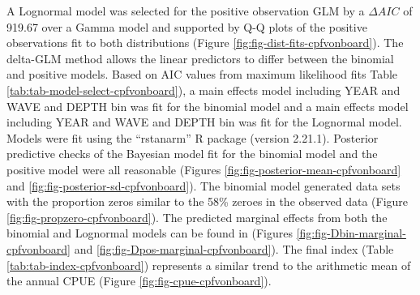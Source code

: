 \documentclass[
]{article}
\begin{document}
A Lognormal model was
selected for the positive observation GLM by
a \(\Delta AIC\) of 919.67 over a Gamma model and supported by Q-Q plots of the positive observations fit to both distributions (Figure \ref{fig:fig-dist-fits-cpfvonboard}). The delta-GLM
method allows the linear predictors to differ between the binomial and positive models.
Based on AIC values from maximum likelihood fits Table \ref{tab:tab-model-select-cpfvonboard}),
a main effects model including
YEAR and WAVE and DEPTH bin
was fit for the binomial model and a main
effects model including
YEAR and WAVE and DEPTH bin
was fit for the Lognormal model.
Models were fit using the ``rstanarm'' R package (version 2.21.1). Posterior predictive
checks of the Bayesian model fit for the binomial model and the positive model
were all reasonable (Figures \ref{fig:fig-posterior-mean-cpfvonboard} and
\ref{fig:fig-posterior-sd-cpfvonboard}). The binomial model generated data sets with the
proportion zeros similar to the 58\% zeroes in the observed data
(Figure \ref{fig:fig-propzero-cpfvonboard}). The predicted marginal effects from
both the binomial and Lognormal models can be found in (Figures \ref{fig:fig-Dbin-marginal-cpfvonboard} and \ref{fig:fig-Dpos-marginal-cpfvonboard}). The
final index (Table \ref{tab:tab-index-cpfvonboard})
represents a similar trend to the arithmetic mean of the annual CPUE (Figure \ref{fig:fig-cpue-cpfvonboard}).

\newpage
\end{document}
